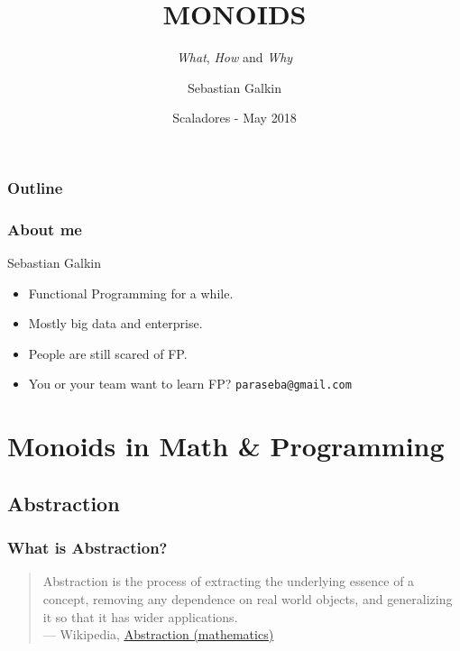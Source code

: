 \documentclass{beamer}
\title[Monoids]{MONOIDS}
\subtitle{\textit{What}, \textit{How} and \textit{Why}}
\author{Sebastian Galkin}
\institute[@paraseba]{\texttt{@paraseba} \\ \texttt{paraseba@gmail.com}}
\date[Scaladores]{Scaladores - May 2018}
\begin{document}

\begin{frame}
  \titlepage
\end{frame}

\begin{frame}
  \frametitle{Outline}
 \tableofcontents
\end{frame}


\begin{frame}
  \frametitle{About me}

  {\LARGE Sebastian Galkin}

  \begin{itemize}
  \item \alert{Functional Programming} for a while.
  \item Mostly big data and enterprise.
  \item People are still scared of FP.
  \item You or your team want to learn FP?
  \color{blue}\texttt{paraseba@gmail.com}
  \end{itemize}


\end{frame}

\section{Monoids in Math \& Programming}
\subsection{Abstraction}

\begin{frame}
  \frametitle{What is Abstraction?}
  \begin{quote}
\alert{Abstraction} is the process of extracting the underlying \alert{essence} of a concept,
removing any \alert{dependence} on real world objects, and \alert{generalizing} it so that it
has \alert{wider applications.}\\[2ex] \rightline
  {{\rm --- Wikipedia, \href{https://en.wikipedia.org/wiki/Abstraction_(mathematics)}{\underline{Abstraction (mathematics)}}}}
  \end{quote}
\end{frame}
\end{document}
